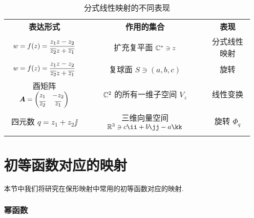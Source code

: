 \begin{table}[H]
  \centering
  \tabcolsep=3mm
  \begin{tabular}{ccc}
    \topcolorrule
      \bf 表达形式&
      \bf 作用的集合&
      \bf 表现\\
    \topcolorrule
      $w=f(z)=\dfrac{z_1z-z_2}{\overline{z_2}z+\overline{z_1}}$&
      扩充复平面 ${\mathbb{C}}^*\ni z$&
      分式线性映射\\
    \midcolorrule
      $w=f(z)=\dfrac{z_1z-z_2}{\overline{z_2}z+\overline{z_1}}$&
      复球面 $S\ni (a,b,c)$&
      旋转\\
    \midcolorrule
      酉矩阵 ${\boldsymbol{A}}=\begin{pmatrix}
        z_1&-z_2\\
        \overline{z_2}&\overline{z_1}
      \end{pmatrix}$&
      ${\mathbb{C}}^2$ 的所有一维子空间 $V_z$&
      线性变换\\
    \midcolorrule
      四元数 $q=z_1+z_2\jj$&
      三维向量空间 $\BR^3\ni c\ii+b\jj-a\kk$&
      旋转 $\Phi_q$\\
    \bottomcolorrule
  \end{tabular}
  \caption{分式线性映射的不同表现}
  \label{tab:fractal-transform-display}
\end{table}



\section{初等函数对应的映射}

本节中我们将研究在保形映射中常用的初等函数对应的映射.

\subsubsection{幂函数}

